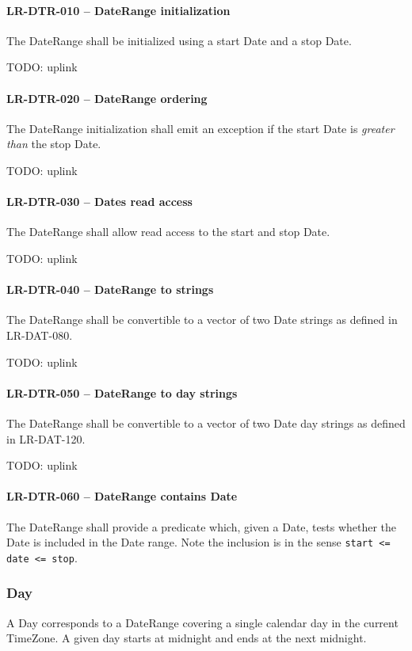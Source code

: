 \paragraph{LR-DTR-010 -- DateRange initialization}
The DateRange shall be initialized using a start Date and a stop Date.

TODO: uplink

\paragraph{LR-DTR-020 -- DateRange ordering}
The DateRange initialization shall emit an exception if the
start Date is \emph{greater than} the stop Date.

TODO: uplink

\paragraph{LR-DTR-030 -- Dates read access}
The DateRange shall allow read access to the start and stop Date.

TODO: uplink
\paragraph{LR-DTR-040 -- DateRange to strings}
The DateRange shall be convertible to a vector of two Date strings
as defined in LR-DAT-080.

TODO: uplink
\paragraph{LR-DTR-050 -- DateRange to day strings}
The DateRange shall be convertible to a vector of two Date day strings
as defined in LR-DAT-120.

TODO: uplink

\paragraph{LR-DTR-060 -- DateRange contains Date}
The DateRange shall provide a predicate which, given a Date,
tests whether the Date is included in the Date range.
Note the inclusion is in the sense \lstinline{start <= date <= stop}.

\subsubsection{Day}
A Day corresponds to a DateRange covering a single calendar day in
the current TimeZone. A given day starts at midnight and ends at the next
midnight.

